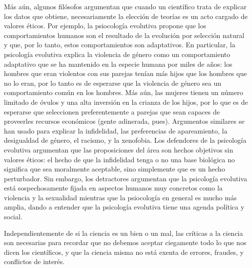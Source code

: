 Más aún, algunos filósofos argumentan que cuando un científico trata de
explicar los datos que obtiene, necesariamente la elección de teorías es un
acto cargado de valores éticos.
Por ejemplo, la psiocología evolutiva propone que los comportamientos humanos
son el resultado de la evolución por selección natural y que, por lo tanto,
estos comportamientos son adaptativos.
En particular, la psicología evolutiva explica la violencia de género como un
comportamiento adaptativo que se ha mantenido en la especie humana por miles de
años: los hombres que eran violentos con sus parejas tenían más hijos que los
hombres que no lo eran, por lo tanto es de esperarse que la violencia de género
sea un comportamiento común en los hombres.
Más aún, las mujeres tienen un número limitado de óvulos y una alta inversión
en la crianza de los hijos, por lo que es de esperarse que seleccionen
preferentemente a parejas que sean capaces de proveerles recursos económicos
(gente adinerada, pues).
Argumentos similares se han usado para explicar la infidelidad, las preferencias
de apareamiento, la desigualdad de género, el racismo, y la xenofobia.
Los defendores de la psicología evolutiva argumentan que las proposiciones del
área son hechos objetivos sin valores éticos: el hecho de que la infidelidad
tenga o no una base biológica no significa que sea moralmente aceptable,
sino simplemente que es un hecho perturbador.
Sin embargo, los detractores argumentan que la psicología evolutiva está
sospechosamente fijada en aspectos humanos muy concretos como la violencia y la
sexualidad mientras que la psiocología en general es mucho más amplia, dando a
entender que la psicología evolutiva tiene una agenda política y social.

Independientemente de si la ciencia es un bien o un mal, las críticas a la
ciencia son necesarias para recordar que no debemos aceptar ciegamente todo lo
que nos dicen los científicos, y que la ciencia misma no está exenta de
errores, fraudes, y conflictos de interés.
